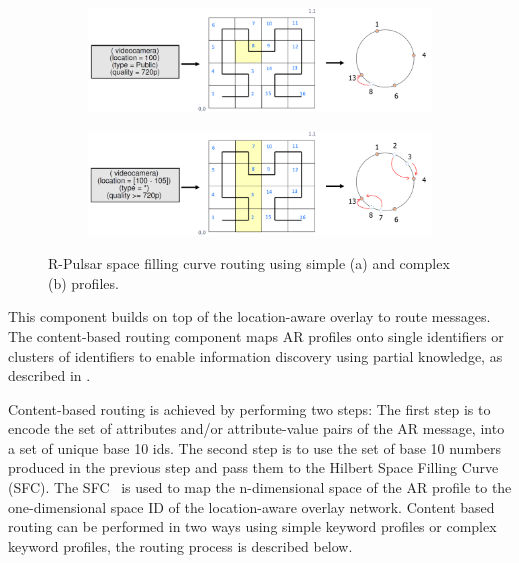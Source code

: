 \begin{figure}
\centering
\begin{subfigure}[b]{0.9\textwidth}
   \includegraphics[width=1\linewidth]{Figures/single.pdf}
   \caption{}
\end{subfigure}
\begin{subfigure}[b]{0.9\textwidth}
   \includegraphics[width=1\linewidth]{Figures/multi.pdf}
   \caption{}
\end{subfigure}
\caption{R-Pulsar space filling curve routing using simple (a) and complex (b) profiles.}\label{fig:routingProfiles} 
\end{figure}


This component builds on top of the location-aware overlay to route messages. The content-based routing component maps AR profiles onto single identifiers or clusters of identifiers to enable information discovery using partial knowledge, as described in \cite{SCHMIDT2008962}.

Content-based routing is achieved by performing two steps: The first step is to encode the set of attributes and/or attribute-value pairs of the AR message, into a set of unique base 10 ids. The second step is to use the set of base 10 numbers produced in the previous step and pass them to the Hilbert Space Filling Curve (SFC). The SFC~\cite{SFC} is used to map the n-dimensional space of the AR profile to the one-dimensional space ID of the location-aware overlay network. Content based routing can be performed in two ways using simple keyword profiles or complex keyword profiles, the routing process is described below.

